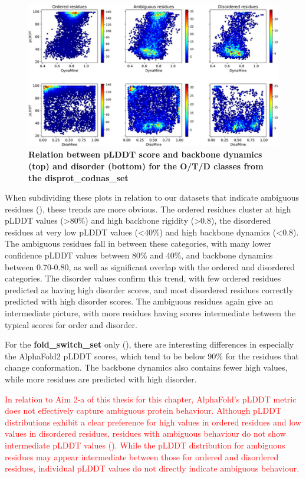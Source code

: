 \begin{figure}[tbh]
    \centering
    \includegraphics[width=\linewidth]{ambiguous//figures_ambiguous/fig6.pdf}
    \caption{\textbf{Relation between pLDDT score and backbone dynamics (top) and disorder (bottom) for the O/T/D classes from the disprot_codnas_set}}
    \label{fig:chapter5:fig6}
\end{figure}

When subdividing these plots in relation to our datasets that indicate ambiguous residues (), these trends are more obvious. The ordered residues cluster at high pLDDT values (>80\%) and high backbone rigidity (>0.8), the disordered residues at very low pLDDT values (<40\%) and high backbone dynamics (<0.8). The ambiguous residues fall in between these categories, with many lower confidence pLDDT values between 80\% and 40\%, and backbone dynamics between 0.70-0.80, as well as significant overlap with the ordered and disordered categories. The disorder values confirm this trend, with few ordered residues predicted as having high disorder scores, and most disordered residues correctly predicted with high disorder scores. The ambiguous residues again give an intermediate picture, with more residues having scores intermediate between the typical scores for order and disorder.

For the \textbf{fold_switch_set} only (), there are interesting differences in especially the AlphaFold2 pLDDT scores, which tend to be below 90\% for the residues that change conformation. The backbone dynamics also contains fewer high values, while more residues are predicted with high disorder.

\textcolor{red}{In relation to Aim 2-a of this thesis for this chapter, AlphaFold's pLDDT metric does not effectively capture ambiguous protein behaviour. Although pLDDT distributions exhibit a clear preference for high values in ordered residues and low values in disordered residues, residues with ambiguous behaviour do not show intermediate pLDDT values (). While the pLDDT distribution for ambiguous residues may appear intermediate between those for ordered and disordered residues, individual pLDDT values do not directly indicate ambiguous behaviour.}


